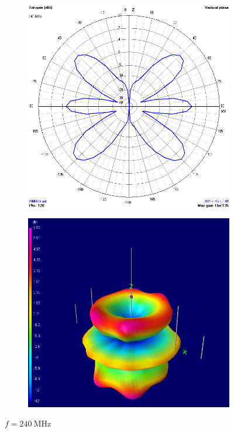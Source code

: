 \begin{figure}[H]
	\begin{subfigure}{0.5\textwidth}
		\includegraphics[scale=0.43]{imagenes/2D_240MHz.png}
	\end{subfigure}	
	\quad
	\begin{subfigure}{0.5\textwidth}
		\includegraphics[scale=0.43]{imagenes/3D_240MHz.png}
	\end{subfigure}
	\caption{$f=\SI{240}{\mega\hertz}$}
	\label{fig.radiacion_240M}
\end{figure}


